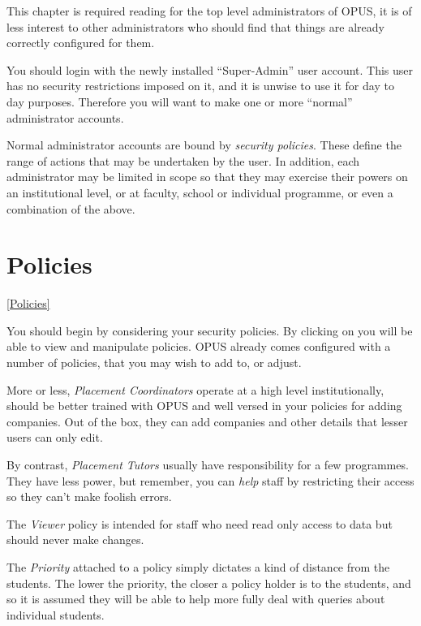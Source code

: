 \documentclass[12 pt]{book}
\begin{document}
This chapter is required reading for the top level administrators of OPUS, it
is of less interest to other administrators who should find that things are
already correctly configured for them.

You should login with the newly installed ``Super-Admin'' user account. This
user has no security restrictions imposed on it, and it is unwise to use it
for day to day purposes. Therefore you will want to make one or more ``normal''
administrator accounts.


Normal administrator accounts are bound by \emph{security policies}. These
define the range of actions that may be undertaken by the user. In addition, 
each administrator may be limited in scope so that they may exercise their
powers on an institutional level, or at faculty, school or individual
programme, or even a combination of the above.

\section{Policies}
\ref{Policies}

You should begin by considering your security policies. By clicking on
 you will be able to view and manipulate
policies. OPUS already comes configured with a number of policies, that you may
wish to add to, or adjust.

More or less, \emph{Placement Coordinators} operate at a high level
institutionally, should be better trained with OPUS and well versed in your
policies for adding companies. Out of the box, they can add companies and other
details that lesser users can only edit.

By contrast, \emph{Placement Tutors} usually have responsibility for a few
programmes. They have less power, but remember, you can \emph{help} staff by
restricting their access so they can't make foolish errors.

The \emph{Viewer} policy is intended for staff who need read only access to
data but should never make changes.

The \emph{Priority} attached to a policy simply dictates a kind of distance
from the students. The lower the priority, the closer a policy holder is to
the students, and so it is assumed they will be able to help more fully deal
with queries about individual students.
\end{document}
